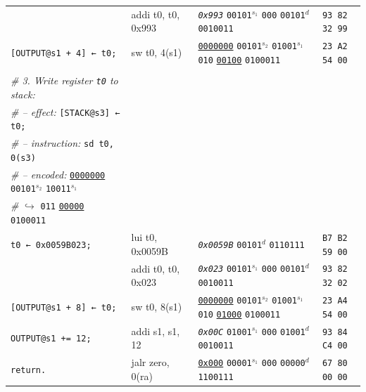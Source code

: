 \documentclass[a4paper,12pt,final]{article}
\begin{document}
\begin{table}[!htbp]
\begin{adjustwidth}{-1cm}{-1cm}
\begin{center}
\begin{tabular}{l|ll|l}
 & addi t0, t0, 0x993 & \emph{\texttt{0x993}}                    \texttt{00101}​\(^{s_{1}}\) \texttt{000} \texttt{00101}​\(^{d}\)  \texttt{0010011} & \texttt{93 82 32 99}\\[0pt]
\texttt{[OUTPUT@s1 + 4] ← t0;} & sw t0, 4(s1) & \uline{\texttt{0000000}} \texttt{00101}​\(^{s_{2}}\) \texttt{01001}​\(^{s_{1}}\) \texttt{010} \uline{\texttt{00100}} \texttt{0100011} & \texttt{23 A2 54 00}\\[0pt]
 &  &  & \\[0pt]
\emph{\# 3. Write register \texttt{t0} to stack:} &  &  & \\[0pt]
\emph{\# – effect:} \texttt{[STACK@s3] ← t0;} &  &  & \\[0pt]
\emph{\# – instruction:} \texttt{sd t0, 0(s3)} &  &  & \\[0pt]
\emph{\# – encoded:} \uline{\texttt{0000000}} \texttt{00101}​\(^{s_{2}}\) \texttt{10011}​\(^{s_{1}}\) &  &  & \\[0pt]
\emph{\#} \hspace{4.7em} \(\hookrightarrow\) \texttt{011} \uline{\texttt{00000}} \texttt{0100011} &  &  & \\[0pt]
\texttt{t0 ← 0x0059B023;} & lui t0, 0x0059B & \emph{\texttt{0x0059B}}                                                  \texttt{00101}​\(^{d}\)  \texttt{0110111} & \texttt{B7 B2 59 00}\\[0pt]
 & addi t0, t0, 0x023 & \emph{\texttt{0x023}}                    \texttt{00101}​\(^{s_{1}}\) \texttt{000} \texttt{00101}​\(^{d}\)  \texttt{0010011} & \texttt{93 82 32 02}\\[0pt]
\texttt{[OUTPUT@s1 + 8] ← t0;} & sw t0, 8(s1) & \uline{\texttt{0000000}} \texttt{00101}​\(^{s_{2}}\) \texttt{01001}​\(^{s_{1}}\) \texttt{010} \uline{\texttt{01000}} \texttt{0100011} & \texttt{23 A4 54 00}\\[0pt]
\texttt{OUTPUT@s1 += 12;} & addi s1, s1, 12 & \emph{\texttt{0x00C}}                    \texttt{01001}​\(^{s_{1}}\) \texttt{000} \texttt{01001}​\(^{d}\)  \texttt{0010011} & \texttt{93 84 C4 00}\\[0pt]
\texttt{return.} & jalr zero, 0(ra) & \uline{\texttt{0x000}}                    \texttt{00001}​\(^{s_{1}}\) \texttt{000} \texttt{00000}​\(^{d}\)  \texttt{1100111} & \texttt{67 80 00 00}\\[0pt]
\end{tabular}

\end{center}
\normalsize \end{adjustwidth} \end{table} \vspace{0}
\end{document}
